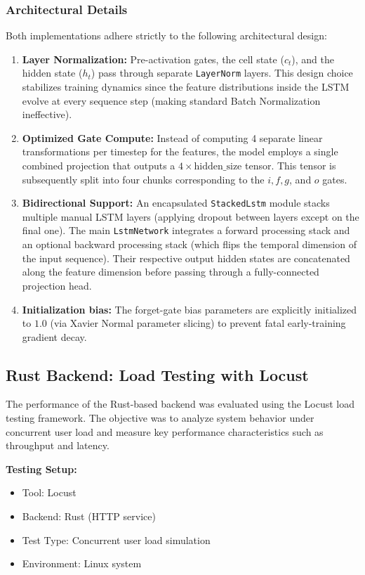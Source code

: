 \documentclass[10pt,a4paper,twocolumn]{article}
\begin{document}
\subsubsection{Architectural Details}
Both implementations adhere strictly to the following architectural design:
\begin{enumerate}
    \item \textbf{Layer Normalization:} Pre-activation gates, the cell state ($c_t$), and the hidden state ($h_t$) pass through separate \texttt{LayerNorm} layers. This design choice stabilizes training dynamics since the feature distributions inside the LSTM evolve at every sequence step (making standard Batch Normalization ineffective).
    \item \textbf{Optimized Gate Compute:} Instead of computing 4 separate linear transformations per timestep for the features, the model employs a single combined projection that outputs a $4 \times \text{hidden\_size}$ tensor. This tensor is subsequently split into four chunks corresponding to the $i, f, g$, and $o$ gates.
    \item \textbf{Bidirectional Support:} An encapsulated \texttt{StackedLstm} module stacks multiple manual LSTM layers (applying dropout between layers except on the final one). The main \texttt{LstmNetwork} integrates a forward processing stack and an optional backward processing stack (which flips the temporal dimension of the input sequence). Their respective output hidden states are concatenated along the feature dimension before passing through a fully-connected projection head.
    \item \textbf{Initialization bias:} The forget-gate bias parameters are explicitly initialized to $1.0$ (via Xavier Normal parameter slicing) to prevent fatal early-training gradient decay.
\end{enumerate}


\subsection{Rust Backend: Load Testing with Locust}

The performance of the Rust-based backend was evaluated using the Locust load testing framework. The objective was to analyze system behavior under concurrent user load and measure key performance characteristics such as throughput and latency.

\textbf{Testing Setup:}
\begin{itemize}
    \item Tool: Locust
    \item Backend: Rust (HTTP service)
    \item Test Type: Concurrent user load simulation
    \item Environment: Linux system
\end{itemize}
\end{document}
